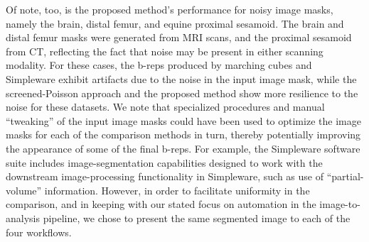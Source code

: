 Of note, too, is the proposed method's performance for noisy image masks, namely the brain, distal femur, and equine proximal sesamoid. The brain and distal femur masks were generated from MRI scans, and the proximal sesamoid from CT, reflecting the fact that noise may be present in either scanning modality.  For these cases, the b-reps produced by marching cubes and Simpleware exhibit artifacts due to the noise in the input image mask, while the screened-Poisson approach and the proposed method show more resilience to the noise for these datasets.  We note that specialized procedures and manual ``tweaking'' of the input image masks could have been used to optimize the image masks for each of the comparison methods in turn, thereby potentially improving the appearance of some of the final b-reps.  For example, the Simpleware software suite includes image-segmentation capabilities designed to work with the downstream image-processing functionality in Simpleware, such as use of ``partial-volume'' information.  However, in order to facilitate uniformity in the comparison, and in keeping with our stated focus on automation in the image-to-analysis pipeline, we chose to present the same segmented image to each of the four workflows.

